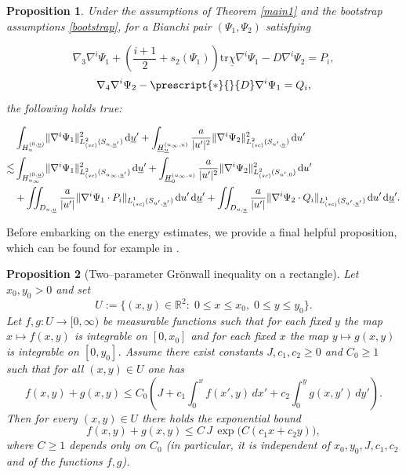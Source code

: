 \documentclass{amsart}
\newtheorem{proposition}{Proposition}[section]
\newcommand{\Hbar}{\underline{H}}
\newcommand{\dubarprime}{\hspace{.5mm} \text{d} \ubar^{\prime}}
\newcommand{\upr}{\lvert u^\prime \rvert}
\newcommand{\chibar}{\underline{\chi}}
\newcommand{\ubar}{\underline{u}}
\newcommand{\scaletwoSuprime}[1]{\lVert{#1} \rVert_{L^2_{(sc)}(S_{u^\prime,\ubar})}}
\newcommand{\scaletwoSuzprime}[1]{\lVert{#1} \rVert_{L^2_{(sc)}(S_{u^\prime,0})}}
\newcommand{\scaleoneSuprimeubarprime}[1]{\lVert{#1} \rVert_{L^1_{(sc)}(S_{u^\prime,\ubar^\prime})}}
\newcommand{\scaletwoSuubarprime}[1]{\lVert{#1} \rVert_{L^2_{(sc)}(S_{u,\ubar^\prime})}}
\newcommand{\scaletwoSuzubarprime}[1]{\lVert{#1} \rVert_{L^2_{(sc)}(S_{u_{\infty},\ubar^\prime})}}
\newcommand{\duprime}{\hspace{.5mm} \text{d}u^{\prime}}
\newcommand{\Hodge}[1]{\prescript{*}{}{#1}}
\def\Hu{H_u^{(0,\underline{u})}}
\def\Hbu{\underline{H}_{\underline{u}}^{(u_{\infty},u)}}
\newcommand{\tr}{\mbox{tr}}
\begin{document}
{\begin{proposition}\label{curvprop}
Under the assumptions of Theorem \ref{main1} and the bootstrap assumptions \eqref{bootstrap}, for a Bianchi pair $(\Psi_1, \Psi_2)$ satisfying

\[ \nabla_3 \nabla^i \Psi_1 + \left( \frac{i+1}{2} + s_2(\Psi_1) \right) \tr\chibar \nabla^i \Psi_1 - D\nabla^i \Psi_2 = P_i,\]\[\nabla_4 \nabla^i \Psi_2 - \Hodge{D} \nabla^i \Psi_1 = Q_i, \]the following holds true:

\begin{equation}
\begin{split}
&\int_{\Hu}\scaletwoSuubarprime{\nabla^i \Psi_1}^2 \dubarprime + \int_{\Hbu}\frac{a}{\upr^2} \scaletwoSuprime{\nabla^i \Psi_2}^2 \duprime \\ \lesssim &\int_{H_{u_{\infty}}^{(0,\ubar)}}\scaletwoSuzubarprime{\nabla^i \Psi_1}^2 \dubarprime + \int_{\Hbar_0^{(u_{\infty},u)}} \frac{a}{\upr^2} \scaletwoSuzprime{\nabla^i \Psi_2}^2 \duprime \\&+  \iint_{D_{u,\ubar}}\frac{a}{\upr} \scaleoneSuprimeubarprime{\nabla^i \Psi_1 \cdot P_i}\duprime \dubarprime + \iint_{D_{u,\ubar}}\frac{a}{\upr} \scaleoneSuprimeubarprime{\nabla^i \Psi_2 \cdot Q_i}\duprime \dubarprime.
  \end{split}
\end{equation}
\end{proposition}
\noindent Before embarking on the energy estimates, we provide a final helpful proposition, which can be found for example in \cite{Kl-Rod}.

\begin{proposition}[Two–parameter Grönwall inequality on a rectangle]
\label{prop:2d-gronwall}
Let $x_0,y_0>0$ and set
\[
U := \{(x,y)\in\mathbb R^2:\; 0\le x\le x_0,\; 0\le y\le y_0\}.
\]
Let $f,g:U\to[0,\infty)$ be measurable functions such that for each fixed
$y$ the map $x\mapsto f(x,y)$ is integrable on $[0,x_0]$ and for each fixed
$x$ the map $y\mapsto g(x,y)$ is integrable on $[0,y_0]$.
Assume there exist constants $J,c_1,c_2\ge 0$ and $C_0\ge 1$ such that for all
$(x,y)\in U$ one has
\begin{equation}
\label{eq:2d-gronwall-assump}
f(x,y)+g(x,y)
\le
C_0\!\left(
J
+ c_1 \int_0^{x} f(x',y)\,dx'
+ c_2 \int_0^{y} g(x,y')\,dy'
\right).
\end{equation}
Then for every $(x,y)\in U$ there holds the exponential bound
\begin{equation}
\label{eq:2d-gronwall-concl}
f(x,y)+g(x,y)
\le
C\, J\, \exp\!\big(C(c_1 x + c_2 y)\big),
\end{equation}
where $C\ge 1$ depends only on $C_0$ (in particular, it is independent of
$x_0,y_0,J,c_1,c_2$ and of the functions $f,g$).
\end{proposition}

}
\end{document}
